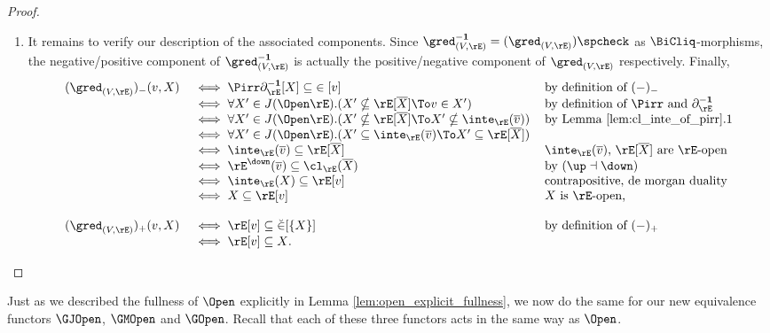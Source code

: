 \documentclass{article}
\begin{document}
\begin{proof}
\begin{enumerate}
\item
It remains to verify our description of the associated components. Since $\gred_{(V,\rE)}^{\bf-1} = (\gred_{(V,\rE)})\spcheck$ as $\BiCliq$-morphisms, the negative/positive component of $\gred_{(V,\rE)}^{\bf-1}$ is actually the positive/negative component of $\gred_{(V,\rE)}$ respectively. Finally,
\[
\begin{tabular}{lll}
$(\gred_{(V,\rE)})_-(v,X)$
&
$\iff \Pirr\partial_\rE^{\bf-1}[X] \subseteq {\in[v]}$
& by definition of $(-)_-$
\\&
$\iff \forall X' \in J(\Open\rE).( X' \nsubseteq \rE[\overline{X}] \To v \in X' )$
& by definition of $\Pirr$ and $\partial_\rE^{\bf-1}$
\\&
$\iff \forall X' \in J(\Open\rE).( X' \nsubseteq \rE[\overline{X}] \To X' \nsubseteq \inte_\rE(\overline{v}) )$
& by Lemma \ref{lem:cl_inte_of_pirr}.1
\\&
$\iff \forall X' \in J(\Open\rE).(  X' \subseteq \inte_\rE(\overline{v}) \To X' \subseteq \rE[\overline{X}] )$
\\&
$\iff \inte_\rE(\overline{v}) \subseteq \rE[\overline{X}]$
& $\inte_\rE(\overline{v})$, $\rE[\overline{X}]$ are $\rE$-open
\\&
$\iff \rE^\down(\overline{v}) \subseteq \cl_\rE(\overline{X})$
& by $(\up\dashv\down)$
\\&
$\iff \inte_\rE(X) \subseteq \rE[v]$
& contrapositive, de morgan duality
\\&
$\iff X \subseteq \rE[v]$
& $X$ is $\rE$-open,
\\
\\
$(\gred_{(V,\rE)})_+(v,X)$
&
$\iff \rE[v] \subseteq \breve{\in}[\{X\}]$
& by definition of $(-)_+$
\\&
$\iff \rE[v] \subseteq X$.
\end{tabular}
\]
\end{enumerate}
\end{proof}



\smallskip
Just as we described the fullness of $\Open$ explicitly in Lemma \ref{lem:open_explicit_fullness}, we now do the same for our new equivalence functors $\GJOpen$, $\GMOpen$ and $\GOpen$. Recall that each of these three functors acts in the same way as $\Open$.
\smallskip
\end{document}
